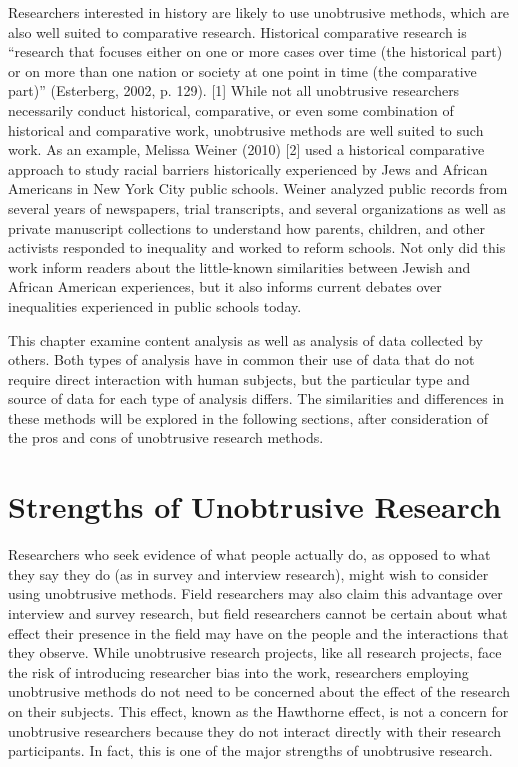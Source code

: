 Researchers interested in history are likely to use unobtrusive methods, which are also well suited to comparative research. Historical comparative research is ``research that focuses either on one or more cases over time (the historical part) or on more than one nation or society at one point in time (the comparative part)'' (Esterberg, 2002, p. 129). [1] While not all unobtrusive researchers necessarily conduct historical, comparative, or even some combination of historical and comparative work, unobtrusive methods are well suited to such work. As an example, Melissa Weiner (2010) [2] used a historical comparative approach to study racial barriers historically experienced by Jews and African Americans in New York City public schools. Weiner analyzed public records from several years of newspapers, trial transcripts, and several organizations as well as private manuscript collections to understand how parents, children, and other activists responded to inequality and worked to reform schools. Not only did this work inform readers about the little-known similarities between Jewish and African American experiences, but it also informs current debates over inequalities experienced in public schools today.

This chapter examine content analysis as well as analysis of data collected by others. Both types of analysis have in common their use of data that do not require direct interaction with human subjects, but the particular type and source of data for each type of analysis differs. The similarities and differences in these methods will be explored in the following sections, after consideration of the pros and cons of unobtrusive research methods.

\section{Strengths of Unobtrusive Research}

Researchers who seek evidence of what people actually do, as opposed to what they say they do (as in survey and interview research), might wish to consider using unobtrusive methods. Field researchers may also claim this advantage over interview and survey research, but field researchers cannot be certain about what effect their presence in the field may have on the people and the interactions that they observe. While unobtrusive research projects, like all research projects, face the risk of introducing researcher bias into the work, researchers employing unobtrusive methods do not need to be concerned about the effect of the research on their subjects. This effect, known as the Hawthorne effect, is not a concern for unobtrusive researchers because they do not interact directly with their research participants. In fact, this is one of the major strengths of unobtrusive research.

